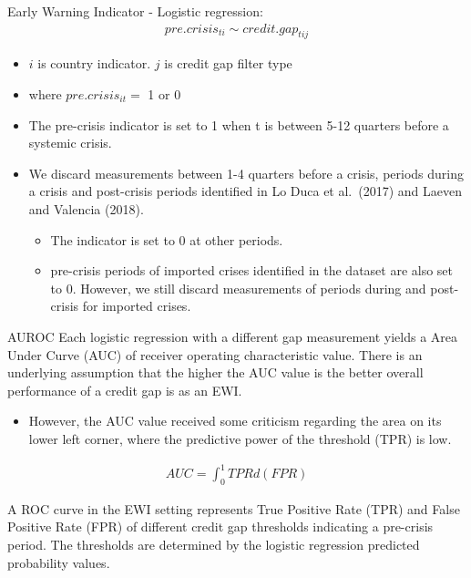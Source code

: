 \documentclass[
  ignorenonframetext,
]{beamer}
\providecommand{\tightlist}{%
  \setlength{\itemsep}{0pt}\setlength{\parskip}{0pt}}
\begin{document}
\begin{frame}{Early Warning Indicator - Logistic regression:}
\protect\hypertarget{early-warning-indicator---logistic-regression}{}
\begin{align}
  pre.crisis_{ti} \sim credit.gap_{tij}
\end{align}

\begin{itemize}
\item
  \(i\) is country indicator. \(j\) is credit gap filter type
\item
  where \(pre.crisis_{it}=\) 1 or 0
\item
  The pre-crisis indicator is set to 1 when t is between 5-12 quarters
  before a systemic crisis.
\item
  We discard measurements between 1-4 quarters before a crisis, periods
  during a crisis and post-crisis periods identified in Lo Duca et
  al.~(2017) and Laeven and Valencia (2018).

  \begin{itemize}
  \tightlist
  \item
    The indicator is set to 0 at other periods.
  \item
    pre-crisis periods of imported crises identified in the dataset are
    also set to 0. However, we still discard measurements of periods
    during and post-crisis for imported crises.
  \end{itemize}
\end{itemize}
\end{frame}

\begin{frame}{AUROC}
\protect\hypertarget{auroc}{}
Each logistic regression with a different gap measurement yields a Area
Under Curve (AUC) of receiver operating characteristic value. There is
an underlying assumption that the higher the AUC value is the better
overall performance of a credit gap is as an EWI.

\begin{itemize}
\tightlist
\item
  However, the AUC value received some criticism regarding the area on
  its lower left corner, where the predictive power of the threshold
  (TPR) is low.
\end{itemize}

\begin{align*}
AUC = \int_0^1 TPR d(FPR)
\end{align*}

A ROC curve in the EWI setting represents True Positive Rate (TPR) and
False Positive Rate (FPR) of different credit gap thresholds indicating
a pre-crisis period. The thresholds are determined by the logistic
regression predicted probability values.
\end{frame}
\end{document}
